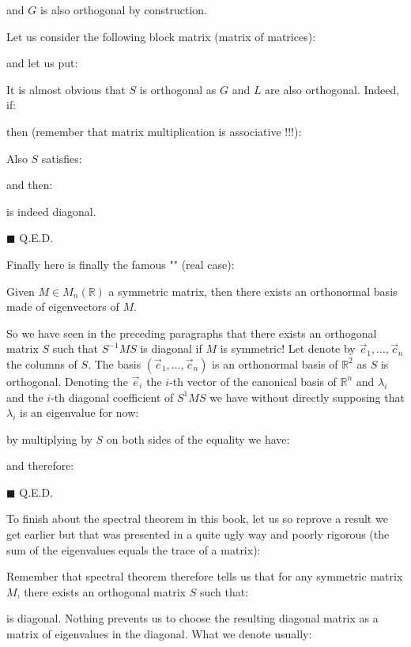 \begin{dem}
	and $G$ is also orthogonal by construction.
	
	Let us consider the following block matrix (matrix of matrices):
	
	and let us put:
	
	It is almost obvious that $S$ is orthogonal as $G$ and $L$ are also orthogonal. Indeed, if:
	
	then (remember that matrix multiplication is associative !!!):
	
	Also $S$ satisfies:
	
	and then:
	
	is indeed diagonal.
	\begin{flushright}
		$\blacksquare$  Q.E.D.
	\end{flushright}
	\end{dem}
	Finally here is finally the famous "" (real case):
	\begin{theorem}
	Given $M\in M_n(\mathbb{R})$ a symmetric matrix, then there exists an orthonormal basis made of eigenvectors of $M$.
	\end{theorem}
	\begin{dem}
	So we have seen in the preceding paragraphs that there exists an orthogonal matrix $S$ such that $S^{-1}MS$ is diagonal if $M$ is symmetric! Let denote by $\vec{c}_1,\ldots,\vec{c}_n$ the columns of $S$. The basis $(\vec{c}_1,\ldots,\vec{c}_n)$ is an orthonormal basis of $\mathbb{R}^2$ as $S$ is orthogonal. Denoting the $\vec{e}_i$ the $i$-th vector of the canonical basis of $\mathbb{R}^n$ and $\lambda_i$ and the $i$-th diagonal coefficient of $S^1{M}S$ we have without directly supposing that $\lambda_i$ is an eigenvalue for now:
	
	by multiplying by $S$ on both sides of the equality we have:
	
	and therefore:
	
	\begin{flushright}
		$\blacksquare$  Q.E.D.
	\end{flushright}
	\end{dem}
	To finish about the spectral theorem in this book, let us so reprove a result we get earlier but that was presented in a quite ugly way and poorly  rigorous (the sum of the eigenvalues equals the trace of a matrix):
	
	Remember that spectral theorem therefore tells us that for any symmetric matrix $M$, there exists an orthogonal matrix $S$ such that:
	
	is diagonal. Nothing prevents us to choose the resulting diagonal matrix as a matrix of eigenvalues in the diagonal. What we denote usually:
	

